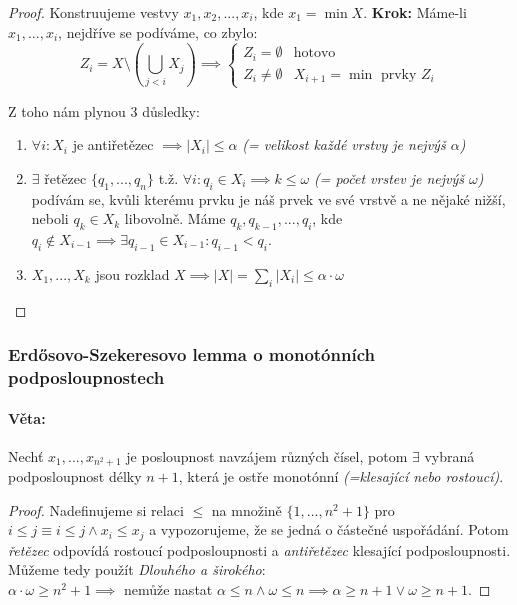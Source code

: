 \documentclass[10pt,a4paper]{article}
\begin{document}
\begin{proof} Konstruujeme vestvy $x_1, x_2, ..., x_i$, kde $x_1 = \min X$.
    \textbf{Krok:} Máme-li $x_1, ..., x_i$, nejdříve se podíváme, co zbylo: 
    \[
    \displaystyle Z_i = X\setminus \left (\bigcup_{j<i} X_j\right ) \implies \begin{cases}
        Z_i = \emptyset &\text{hotovo}\\
        Z_i \neq \emptyset & X_{i+1} = \min \text{ prvky } Z_i
        \end{cases}
    \]

    Z toho nám plynou $3$ důsledky:

    \begin{enumerate}
        \item $\forall i: X_i$ je antiřetězec $\implies |X_i|\leq \alpha$ \textit{(= velikost každé vrstvy je nejvýš $\alpha$)}
        \item $\exists$ řetězec $\{q_1, ..., q_n\}$ t.ž. $\forall i: q_i \in X_i \implies k \leq \omega$ \textit{(= počet vrstev je nejvýš $\omega$)}\\
            podívám se, kvůli kterému prvku je náš prvek ve své vrstvě a ne nějaké nižší, neboli $q_k\in X_k$ libovolně. Máme $q_k, q_{k-1}, ..., q_i$, kde $q_i \notin X_{i-1} \implies \exists q_{i-1} \in X_{i-1}: q_{i-1} < q_i$.
        \item $X_1, ..., X_k$ jsou rozklad $X \implies |X| = \sum_{i} |X_i| \leq \alpha \cdot \omega$
    \end{enumerate}
    
\end{proof}

\subsubsection{Erdősovo-Szekeresovo lemma o monotónních podposloupnostech}
\paragraph*{Věta: } Nechť $x_1, ..., x_{n^2+1}$ je posloupnost navzájem různých čísel, potom $\exists$ vybraná podposloupnost délky $n+1$, která je ostře monotónní \textit{(=klesající nebo rostoucí)}.
\begin{proof}
    Nadefinujeme si relaci $\leq$ na množině $\{1, ..., n^2 + 1\}$ pro $i\leq j \equiv i\leq j \land x_i \leq x_j$ a vypozorujeme, že se jedná o částečné uspořádání.
    Potom \textit{řetězec} odpovídá rostoucí podposloupnosti a \textit{antiřetězec} klesající podposloupnosti. Můžeme tedy použít \textit{Dlouhého a širokého}:\\$\alpha \cdot \omega \geq n^2 + 1 \implies$ nemůže nastat $\alpha \leq n \land \omega \leq n \implies \alpha \geq n+1 \lor \omega \geq n+1$.
\end{proof}
\end{document}
